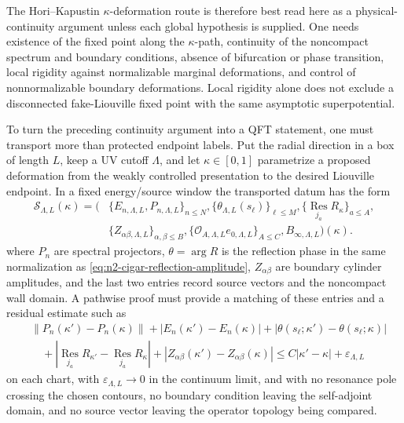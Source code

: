 The Hori--Kapustin \(\kappa\)-deformation route is therefore best read here as
a physical-continuity argument unless each global hypothesis is supplied.  One
needs existence of the fixed point along the \(\kappa\)-path, continuity of the
noncompact spectrum and boundary conditions, absence of bifurcation or phase
transition, local rigidity against normalizable marginal deformations, and
control of nonnormalizable boundary deformations.  Local rigidity alone does
not exclude a disconnected fake-Liouville fixed point with the same asymptotic
superpotential.

\begin{remark}
\label{rem:cigar-liouville-pathwise-fake-fixed-point-obligation}
To turn the preceding continuity argument into a QFT statement, one must
transport more than protected endpoint labels.  Put the radial direction in a
box of length \(L\), keep a UV cutoff \(\Lambda\), and let
\(\kappa\in[0,1]\) parametrize a proposed deformation from the weakly
controlled presentation to the desired Liouville endpoint.  In a fixed
energy/source window the transported datum has the form
\[
  \begin{aligned}
  {\mathcal S}_{\Lambda,L}(\kappa)
  =
  \bigl(
  &\{E_{n,\Lambda,L},P_{n,\Lambda,L}\}_{n\le N},
    \{\theta_{\Lambda,L}(s_\ell)\}_{\ell\le M},
    \{\operatorname*{Res}_{j_a}R_{\kappa}\}_{a\le A},
  \\
  &\{Z_{\alpha\beta,\Lambda,L}\}_{\alpha,\beta\le B},
    \{{\mathcal O}_{A,\Lambda,L}e_{0,\Lambda,L}\}_{A\le C},
    B_{\infty,\Lambda,L}
  \bigr)(\kappa).
  \end{aligned}
\]
where \(P_n\) are spectral projectors, \(\theta=\arg R\) is the reflection
phase in the same normalization as \eqref{eq:n2-cigar-reflection-amplitude},
\(Z_{\alpha\beta}\) are boundary cylinder amplitudes, and the last two entries
record source vectors and the noncompact wall domain.  A pathwise proof must
provide a matching of these entries and a residual estimate such as
\begin{equation}
  \begin{aligned}
  &\|P_n(\kappa')-P_n(\kappa)\|
  +|E_n(\kappa')-E_n(\kappa)|
  +|\theta(s_\ell;\kappa')-\theta(s_\ell;\kappa)|\\
  &\quad
  +|\operatorname*{Res}_{j_a}R_{\kappa'}
       -\operatorname*{Res}_{j_a}R_{\kappa}|
  +|Z_{\alpha\beta}(\kappa')-Z_{\alpha\beta}(\kappa)|
  \le C|\kappa'-\kappa|+\varepsilon_{\Lambda,L}
  \end{aligned}
  \label{eq:cigar-liouville-pathwise-spectral-transport}
\end{equation}
on each chart, with \(\varepsilon_{\Lambda,L}\to0\) in the continuum limit,
and with no resonance pole crossing the chosen contours, no boundary condition
leaving the self-adjoint domain, and no source vector leaving the operator
topology being compared.


\end{remark}
